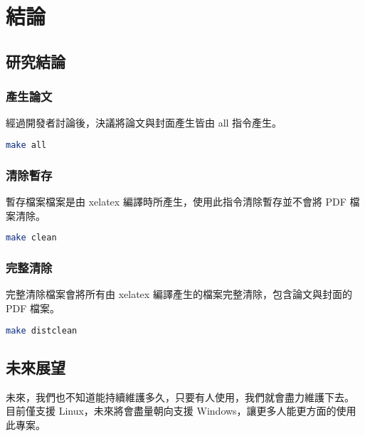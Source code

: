 
\chapter{結論} \label{conclusion_and_future}

\section{研究結論}

\subsection*{產生論文}

經過開發者討論後，決議將論文與封面產生皆由 all 指令產生。

\begin{lstlisting}[language=bash]
    make all
\end{lstlisting}

\subsection*{清除暫存}

暫存檔案檔案是由 xelatex 編譯時所產生，使用此指令清除暫存並不會將 PDF 檔案清除。

\begin{lstlisting}[language=bash]
    make clean
\end{lstlisting}

\subsection*{完整清除}

完整清除檔案會將所有由 xelatex 編譯產生的檔案完整清除，包含論文與封面的 PDF 檔案。

\begin{lstlisting}[language=bash]
    make distclean
\end{lstlisting}

\section{未來展望}

未來，我們也不知道能持續維護多久，只要有人使用，我們就會盡力維護下去。
目前僅支援 Linux，未來將會盡量朝向支援 Windows，讓更多人能更方面的使用此專案。
